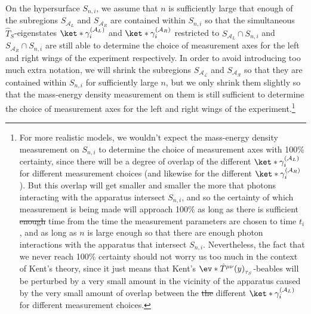 \documentclass[12pt]{report}
\providecommand{\DIFdel}[1]{{\protect\color{red}\sout{#1}}}                      %
\providecommand{\DIFdelbegin}{} %
\providecommand{\DIFdelend}{} %
\begin{document}
On the hypersurface $S_{n,i}$, we assume that $n$ is sufficiently large that enough of the subregions $S_{\mathcal{A}_L}$ and $S_{\mathcal{A}_R}$ are contained within $S_{n,i}$ so that the simultaneous $\hat{T}_S$-eigenstates $\ket*{\gamma_i^{(\mathcal{A}_L)}}$ and $\ket*{\gamma_i^{(\mathcal{A}_R)}}$ restricted to $S_{\mathcal{A}_L}\cap S_{n,i}$ and $S_{\mathcal{A}_R}\cap S_{n,i}$ are still able to determine the choice of measurement axes for the left and right wings of the experiment respectively. In order to avoid introducing too much extra notation, we will shrink the subregions $S_{\mathcal{A_L}}$ and $S_{\mathcal{A_R}}$ so that they are contained within $S_{n,i}$ for sufficiently large $n$, but we only shrink them slightly so that the mass-energy density measurement on them is still sufficient to determine the choice of measurement axes for the left and right wings of the experiment.\footnote{For more realistic models, we wouldn't expect the mass-energy density measurement on $S_{n,i}$ to determine the choice of measurement axes with 100\% certainty, since there will be a degree of overlap of the different $\ket*{\gamma_i^{(\mathcal{A}_L)}}$ for different measurement choices (and likewise for the different $\ket*{\gamma_i^{(\mathcal{A}_R)}}$). But this overlap will get smaller and smaller the more that photons interacting with the apparatus intersect $S_{n,i}$, and so the certainty of which measurement is being made will approach 100\% as long as there is sufficient \DIFdelbegin \DIFdel{enough }\DIFdelend time from the time the measurement parameters are chosen to time $t_i$, and as long as $n$ is large enough so that there are enough photon interactions with the apparatus that intersect $S_{n,i}$. Nevertheless, the fact that we never reach 100\% certainty should not worry us too much in the context of Kent's theory, since it just means that Kent's $\ev*{\hat{T}^{\mu\nu}(y)}_{\tau_S}$-beables will be perturbed by a very small amount in the vicinity of the apparatus caused by the very small amount of overlap between the \DIFdelbegin \DIFdel{the }\DIFdelend different $\ket*{\gamma_i^{(\mathcal{A}_L)}}$ for different measurement choices. }   
\end{document}
